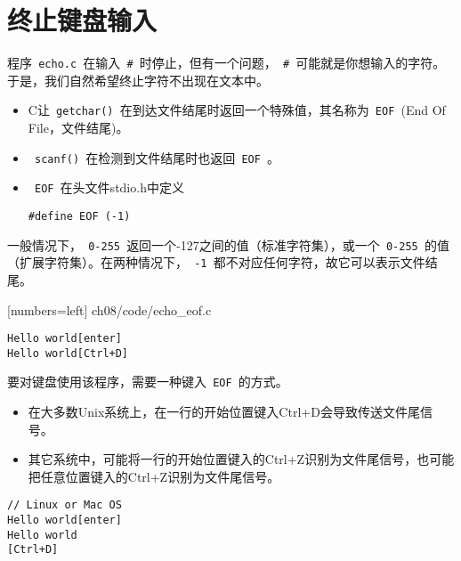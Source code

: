 \section{终止键盘输入}
\begin{frame}[fragile]\ft{\secname}
程序\lstinline| echo.c |在输入\lstinline| # |时停止，但有一个问题，\lstinline| # |可能就是你想输入的字符。于是，我们自然希望终止字符不出现在文本中。
\end{frame}

\begin{frame}[fragile]
\begin{itemize}
\item 
C让\lstinline| getchar() |在到达文件结尾时返回一个特殊值，其名称为\lstinline| EOF |(End Of File，文件结尾)。\\[0.1in]
\item
\lstinline| scanf() |在检测到文件结尾时也返回\lstinline| EOF |。\\[0.1in]
\item \lstinline| EOF |在头文件{\tf stdio.h}中定义
\begin{lstlisting}
#define EOF (-1)
\end{lstlisting}
\end{itemize}
\end{frame}

\begin{frame}[fragile]
一般情况下，\lstinline| 0-255 |返回一个{-127}之间的值（标准字符集），或一个\lstinline| 0-255 |的值（扩展字符集）。在两种情况下，\lstinline| -1 |都不对应任何字符，故它可以表示文件结尾。
\end{frame}

\begin{frame}[fragile]

[numbers=left]
{ch08/code/echo_eof.c}
\end{frame}

\begin{frame}[fragile]
\begin{lstlisting}
Hello world[enter]
Hello world[Ctrl+D]
\end{lstlisting}
\end{frame}

\begin{frame}[fragile]
要对键盘使用该程序，需要一种键入\lstinline| EOF |的方式。\vspace{.1in}

\begin{itemize}
\item 在大多数Unix系统上，在一行的开始位置键入Ctrl+D会导致传送文件尾信号。\\[0.1in]
\item 其它系统中，可能将一行的开始位置键入的Ctrl+Z识别为文件尾信号，也可能把任意位置键入的Ctrl+Z识别为文件尾信号。
\end{itemize}
\end{frame}

\begin{frame}[fragile]
  \begin{lstlisting}[backgroundcolor=\color{blue!20}]
// Linux or Mac OS    
Hello world[enter]
Hello world
[Ctrl+D]
\end{lstlisting}
\end{frame}
